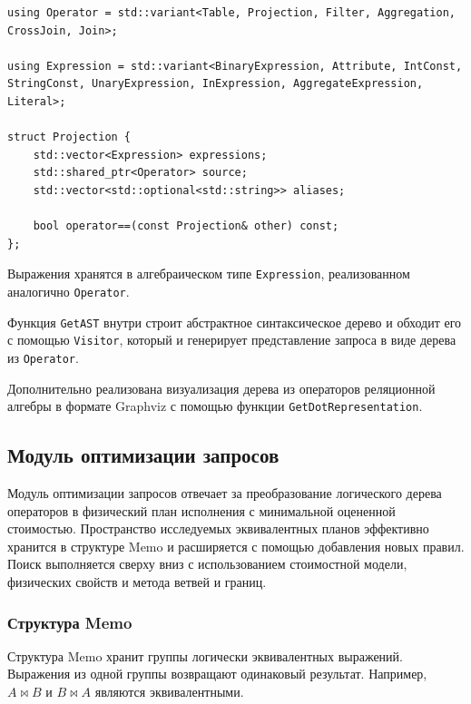 \documentclass[fontsize=14pt, russian]{scrartcl}
\begin{document}
\begin{listing}[H]
  \caption{Объявление типов для операторов реляционной алегебры и выражений.}
  \label{lst:logical}
  \begin{verbatim}
using Operator = std::variant<Table, Projection, Filter, Aggregation, CrossJoin, Join>;

using Expression = std::variant<BinaryExpression, Attribute, IntConst, StringConst, UnaryExpression, InExpression, AggregateExpression, Literal>;

struct Projection {
    std::vector<Expression> expressions;
    std::shared_ptr<Operator> source;
    std::vector<std::optional<std::string>> aliases;

    bool operator==(const Projection& other) const;
};
  \end{verbatim}
\end{listing}

Выражения хранятся в алгебраическом типе \verb|Expression|, реализованном
аналогично \verb|Operator|.

Функция \verb|GetAST| внутри строит абстрактное синтаксическое дерево и обходит
его с помощью \verb|Visitor|, который и генерирует представление запроса в виде
дерева из \verb|Operator|.

Дополнительно реализована визуализация дерева из операторов реляционной алгебры
в формате Graphviz с помощью функции \verb|GetDotRepresentation|.

\subsection{Модуль оптимизации запросов}

Модуль оптимизации запросов отвечает за преобразование логического дерева
операторов в физический план исполнения с минимальной оцененной стоимостью.
Пространство исследуемых эквивалентных планов эффективно хранится в структуре
Memo и расширяется с помощью добавления новых правил. Поиск выполняется сверху
вниз с использованием стоимостной модели, физических свойств и метода ветвей и
границ.

\subsubsection{Структура Memo}

Структура Memo хранит группы логически эквивалентных выражений. Выражения из
одной группы возвращают одинаковый результат. Например, $A \Join B$ и
$B \Join A$ являются эквивалентными.
\end{document}
